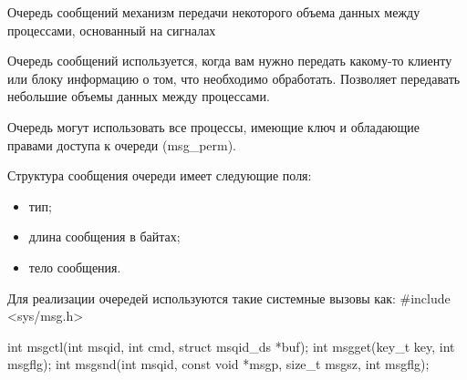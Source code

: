 \begin{defi}{Очередь сообщений}
	механизм передачи некоторого объема данных между процессами, основанный на сигналах
\end{defi}

Очередь сообщений используется, когда вам нужно передать какому-то клиенту или блоку информацию о том, что необходимо обработать. Позволяет передавать небольшие объемы данных между процессами. 

Очередь могут использовать все процессы, имеющие ключ и обладающие правами доступа к очереди (msg\_perm).

Структура сообщения очереди имеет следующие поля:

\begin{itemize}
	\item тип;
	\item длина сообщения в байтах;
	\item тело сообщения.
\end{itemize}

\begin{CCode}{Для реализации очередей используются такие системные вызовы как:}
	#include <sys/msg.h>

	int msgctl(int	msqid, int cmd,	struct msqid_ds	*buf);
	int msgget(key_t key, int msgflg);
	int msgsnd(int	msqid, const void *msgp, size_t	msgsz, int msgflg); \end{CCode}